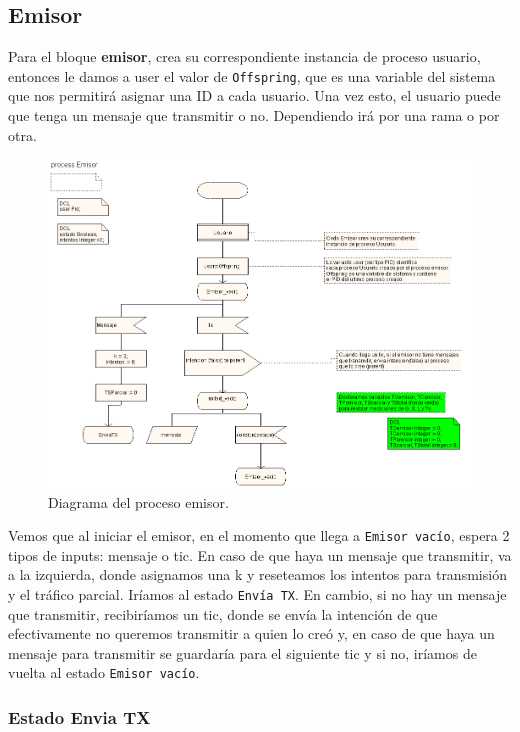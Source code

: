 \documentclass{article}
\begin{document}
\quad

\subsection{Emisor}

Para el bloque \textbf{emisor}, crea su correspondiente instancia de proceso usuario, entonces le damos a user el valor de \verb|Offspring|,  que es una variable del sistema que nos permitirá asignar una ID a cada usuario. Una vez esto, el usuario puede que tenga un mensaje que transmitir o no. Dependiendo irá por una rama o por otra. 

\begin{figure}[h]
    \centering
    \includegraphics[width=0.8\linewidth]{src/Estado emisor.png}
    \caption{\label{fig:emisorbl} Diagrama del proceso emisor.}
\end{figure}

Vemos que al iniciar el emisor, en el momento que llega a \verb|Emisor vacío|, espera 2 tipos de inputs: mensaje o tic. En caso de que haya un mensaje que transmitir, va a la izquierda, donde asignamos una k y reseteamos los intentos para transmisión y el tráfico parcial. Iríamos al estado \verb|Envía TX|. En cambio, si no hay un mensaje que transmitir, recibiríamos un tic, donde se envía la intención de que efectivamente no queremos transmitir a quien lo creó y, en caso de que haya un mensaje para transmitir se guardaría para el siguiente tic y si no, iríamos de vuelta al estado \verb|Emisor vacío|. 

\subsubsection{Estado Envia TX}
\end{document}
